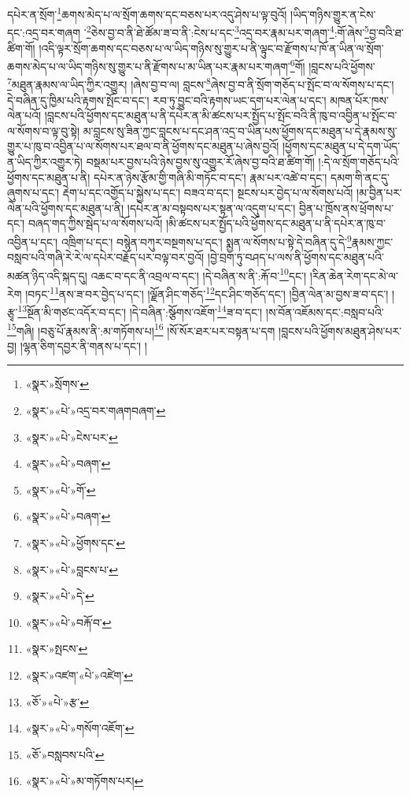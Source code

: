 དཔེར་ན་སྲོག་\footnote{«སྣར་»སྲོགས་}ཆགས་མེད་པ་ལ་སྲོག་ཆགས་དང་བཅས་པར་འདུ་ཤེས་པ་ལྟ་བུའོ། །ཡིད་གཉིས་གྱུར་ན་ངེས་དང་:འདྲ་བར་གཞག ་\footnote{«སྣར་»«པེ་»འདྲ་བར་གཞགབཞག་}ཅེས་བྱ་བ་ནི་ཐེ་ཚོམ་ཟ་བ་ནི་:ངེས་པ་དང་\footnote{«སྣར་»«པེ་»ངེས་པར་}འདྲ་བར་རྣམ་པར་གཞག་\footnote{«སྣར་»«པེ་»བཞག་}:གོ་ཞེས་\footnote{«སྣར་»«པེ་»གོ་}བྱ་བའི་ཐ་ཚིག་གོ། །འདི་ལྟར་སྲོག་ཆགས་དང་བཅས་པ་ལ་ཡིད་གཉིས་སུ་གྱུར་པ་ནི་ལྟུང་བ་རྫོགས་པ་ཁོ་ན་ཡིན་ལ་སྲོག་ཆགས་མེད་པ་ལ་ཡིད་གཉིས་སུ་གྱུར་པ་ནི་རྫོགས་པ་མ་ཡིན་པར་རྣམ་པར་གཞག་\footnote{«སྣར་»«པེ་»བཞག་}གོ། །བླངས་པའི་ཕྱོགས་\footnote{«སྣར་»«པེ་»ཕྱོགས་དང་}མཐུན་རྣམས་ལ་ཡིད་ཀྱིར་འགྱུར། །ཞེས་བྱ་བ་ལ། བླངས་\footnote{«སྣར་»«པེ་»བླངས་པ་}ཞེས་བྱ་བ་ནི་སྲོག་གཅོད་པ་སྤོང་བ་ལ་སོགས་པ་དང་། དེ་བཞིན་དུ་ཁྱིམ་པའི་རྟགས་སྤོང་བ་དང་། རབ་ཏུ་བྱུང་བའི་རྟགས་ཡང་དག་པར་ལེན་པ་དང་། མཁན་པོར་ཁས་ལེན་པའོ། །བླངས་པའི་ཕྱོགས་དང་མཐུན་པ་ནི་དཔེར་ན་མི་ཚངས་པར་སྤྱོད་པ་སྤོང་བའི་ནི་ཁུ་བ་འབྱིན་པ་སྤོང་བ་ལ་སོགས་བ་ལྟ་བུ་སྟེ། མ་བླངས་སུ་ཟིན་ཀྱང་བླངས་པ་དང་ཤན་འདྲ་བ་ཡིན་པས་ཕྱོགས་དང་མཐུན་པ་དེ་རྣམས་སུ་གྱུར་པ་ཁུ་བ་འབྱིན་པ་ལ་སོགས་པར་ཐལ་བ་ནི་ཕྱོགས་དང་མཐུན་པ་ཞེས་བྱའོ། །ཕྱོགས་དང་མཐུན་པ་དེ་དག་ཡོད་ན་ཡིད་ཀྱིར་འགྱུར་ཏེ། བསྡམ་པར་བྱས་པའི་ཉེས་བྱས་སུ་འགྱུར་རོ་ཞེས་བྱ་བའི་ཐ་ཚིག་གོ། །:དེ་ལ་སྲོག་གཅོད་པའི་ཕྱོགས་དང་མཐུན་པ་ནི། དཔེར་ན་ཉེས་རྩོམ་གྱི་གཞི་མི་གཏོང་བ་དང་། རྣམ་པར་འཚེ་བ་དང་། དམག་གི་ནང་དུ་ཞུགས་པ་དང་། རྡེག་པ་དང་འགྱོད་པ་སྐྱེས་པ་དང་། བཟའ་བ་དང་། སྔངས་པར་བྱེད་པ་ལ་སོགས་པའོ། །མ་བྱིན་པར་ལེན་པའི་ཕྱོགས་དང་མཐུན་པ་ནི། །དཔེར་ན་མ་བསྟབས་པར་སྟན་ལ་འདུག་པ་དང་། བྱིན་པ་ཁྲོས་ནས་ཕྲོགས་པ་དང་། བཞད་གད་ཀྱིས་སྦེད་པ་ལ་སོགས་པའོ། །མི་ཚངས་པར་སྤྱོད་པའི་ཕྱོགས་དང་མཐུན་པ་ནི་དཔེར་ན་ཁུ་བ་འབྱིན་པ་དང་། འཁྲིག་པ་དང་། བསྙེན་བཀུར་བསྔགས་པ་དང་། སྨྱན་ལ་སོགས་པ་སྟེ་དེ་བཞིན་དུ་དེ་\footnote{«སྣར་»«པེ་»དེ་}རྣམས་ཀྱང་བསླབ་པའི་གཞི་རེ་རེ་ལ་དཔེར་བརྗོད་པར་བལྟ་བར་བྱའོ། །བྱེ་བྲག་ཏུ་བཤད་པ་ལས་ནི་ཕྱོགས་དང་མཐུན་པའི་མཚན་ཉིད་འདི་སྐད་དུ། འཆང་བ་དང་ནི་འབྲལ་བ་དང་། །དེ་བཞིན་ས་ནི་:རྐོ་བ་\footnote{«སྣར་»«པེ་»བརྐོ་བ་}དང་། །རིན་ཆེན་རེག་དང་མེ་ལ་རེག །བཏང་\footnote{«སྣར་»སྤངས་}ནས་ཟ་བར་བྱེད་པ་དང་། །ལྗོན་ཤིང་གཅོད་\footnote{«སྣར་»འཛག་«པེ་»འཛེག་}དང་ཤིང་གཅོད་དང་། །བྱིན་ལེན་མ་བྱས་ཟ་བ་དང་། །རྩྭ་\footnote{«ཅོ་»«པེ་»རྩ་}སྔོན་མི་གཙང་འདོར་བ་དང་། །དེ་བཞིན་:སྩོགས་འཇོག་\footnote{«སྣར་»«པེ་»གསོག་འཇོག་}ཟ་བ་དང་། །ས་བོན་འཇོམས་དང་:བསླབ་པའི་\footnote{«ཅོ་»བསླབས་པའི་}གཞི། །བཅུ་པོ་རྣམས་ནི་:མ་གཏོགས་པ།\footnote{«སྣར་»«པེ་»མ་གཏོགས་པར།} །སོ་སོར་ཐར་པར་བསྟན་པ་དག །བླངས་པའི་ཕྱོགས་མཐུན་ཤེས་པར་བྱ། །ལྷན་ཅིག་དབྱར་ནི་གནས་པ་དང་། །
